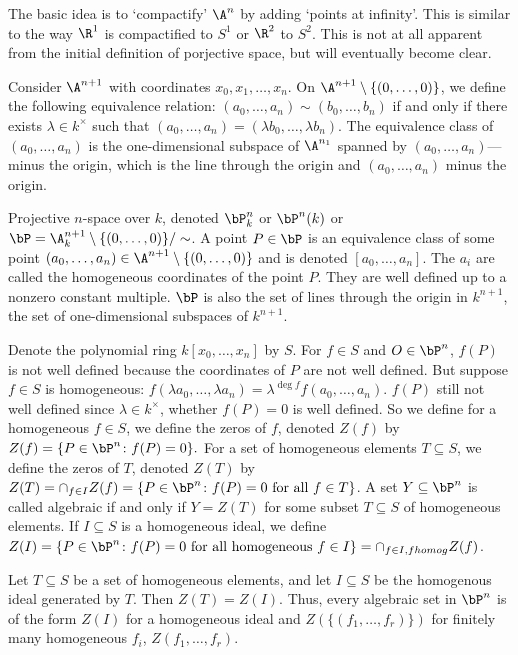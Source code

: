 The basic idea is to `compactify' $\A^n$ by adding `points at infinity'. This is similar to the way $\R^1$ is compactified to $S^1$ or $\R^2$ to $S^2$. This is not at all apparent from the initial definition of porjective space, but will eventually become clear. 


Consider $\A^{n+1}$ with coordinates $x_0,x_1,\ldots,x_n$. On $\A^{n+1} \setminus \{(0,\ldots,0)\}$, we define the following equivalence relation: $(a_0,\ldots,a_n) \sim (b_0,\ldots,b_n)$ if and only if there exists $\lambda \in k^\times$ such that $(a_0,\ldots,a_n)= (\lambda b_0,\ldots,\lambda b_n)$. The equivalence class of $(a_0,\ldots,a_n)$ is the one-dimensional subspace of $\A^{n_1}$ spanned by $(a_0,\ldots,a_n)$---minus the origin, which is the line through the origin and $(a_0,\ldots,a_n)$ minus the origin. 


\begin{dfn}
Projective $n$-space over $k$, denoted $\bP_k^n$ or $\bP^n(k)$ or $\bP= \A_k^{n+1} \setminus \{(0,\ldots,0)\}/\sim$. A point $P \in \bP$ is an equivalence class of some point $(a_0,\ldots,a_n) \in \A^{n+1} \setminus \{(0,\ldots,0)\}$ and is denoted $[a_0,\ldots,a_n]$. The $a_i$ are called the homogeneous coordinates of the point $P$. They are well defined up to a nonzero constant multiple. $\bP$ is also the set of lines through the origin in $k^{n+1}$, the set of one-dimensional subspaces of $k^{n+1}$. 
\end{dfn}



Denote the polynomial ring $k[x_0,\ldots,x_n]$ by $S$. For $f \in S$ and $O \in \bP^n$, $f(P)$ is not well defined because the coordinates of $P$ are not well defined. But suppose $f \in S$ is homogeneous: $f(\lambda a_0,\ldots, \lambda a_n) = \lambda^{\deg f} f(a_0,\ldots,a_n)$. $f(P)$ still not well defined since $\lambda \in k^\times$, whether $f(P)=0$ is well defined. So we define for a homogeneous $f \in S$, we define the zeros of $f$, denoted $Z(f)$ by $Z(f)= \{ P \in \bP^n \colon f(P)= 0\}.$ For a set of homogeneous elements $T \subseteq S$, we define the zeros of $T$, denoted $Z(T)$ by $Z(T)= \cap_{f \in I} Z(f)= \{P \in \bP^n \colon f(P)=0 \text{ for all }f \in T\}$. A set $Y \subseteq \bP^n$ is called algebraic if and only if $Y= Z(T)$ for some subset $T \subseteq S$ of homogeneous elements. If $I \subseteq S$ is a homogeneous ideal, we define $Z(I)= \{ P \in \bP^n \colon f(P)=0 \text{ for all homogeneous } f \in I\}= \cap_{f \in I, f homog} Z(f)$.


\begin{prop}
Let $T \subseteq S$ be a set of homogeneous elements, and let $I \subseteq S$ be the homogenous ideal generated by $T$. Then $Z(T)= Z(I)$. Thus, every algebraic set in $\bP^n$ is of the form $Z(I)$ for a homogeneous ideal and $Z(\{(f_1,\ldots,f_r)\})$ for finitely many homogeneous $f_i$, $Z(f_1,\ldots,f_r)$. 
\end{prop}


